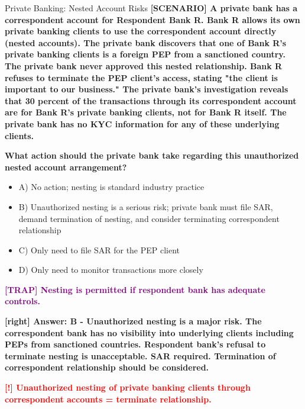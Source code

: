 \documentclass[11pt,a4paper]{beamer}
\newcommand{\redflag}[1]{\textcolor{red}{\textbf{[!] #1}}}
\newcommand{\trap}[1]{\textcolor{purple}{\textbf{[TRAP] #1}}}
\newcommand{\correct}[1]{\textcolor{green!50!black}{\textbf{[right] #1}}}
\newcommand{\scenario}[1]{\textcolor{blue!70!black}{\textbf{[SCENARIO] #1}}}
\begin{document}
	
	\begin{frame}{Private Banking: Nested Account Risks}
		\tiny
		\scenario{A private bank has a correspondent account for Respondent Bank R. Bank R allows its own private banking clients to use the correspondent account directly (nested accounts). The private bank discovers that one of Bank R's private banking clients is a foreign PEP from a sanctioned country. The private bank never approved this nested relationship. Bank R refuses to terminate the PEP client's access, stating "the client is important to our business." The private bank's investigation reveals that 30 percent of the transactions through its correspondent account are for Bank R's private banking clients, not for Bank R itself. The private bank has no KYC information for any of these underlying clients.}
		
		\vspace{0.02cm}
		\textbf{What action should the private bank take regarding this unauthorized nested account arrangement?}
		\vspace{0.02cm}
		
		\begin{itemize}
			\item A) No action; nesting is standard industry practice
			\item B) Unauthorized nesting is a serious risk; private bank must file SAR, demand termination of nesting, and consider terminating correspondent relationship
			\item C) Only need to file SAR for the PEP client
			\item D) Only need to monitor transactions more closely
		\end{itemize}
		
		\vspace{0.02cm}
		\trap{Nesting is permitted if respondent bank has adequate controls.}
		
		\vspace{0.02cm}
		\correct{Answer: B - Unauthorized nesting is a major risk. The correspondent bank has no visibility into underlying clients including PEPs from sanctioned countries. Respondent bank's refusal to terminate nesting is unacceptable. SAR required. Termination of correspondent relationship should be considered.}
		
		\vspace{0.02cm}
		\redflag{Unauthorized nesting of private banking clients through correspondent accounts = terminate relationship.}
	\end{frame}
	
\end{document}
